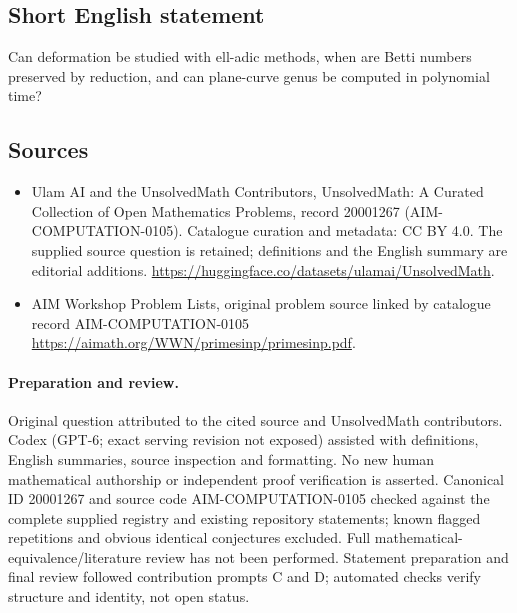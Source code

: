 \documentclass[11pt]{article}
\begin{document}
\subsection{Short English statement}
Can deformation be studied with ell-adic methods, when are Betti numbers preserved by reduction, and can plane-curve genus be computed in polynomial time?
\subsection{Sources}
\begin{itemize}
\item[\hypertarget{source:20001267:1}{S1}] Ulam AI and the UnsolvedMath Contributors, UnsolvedMath: A Curated Collection of Open Mathematics Problems, record 20001267 (AIM-COMPUTATION-0105). Catalogue curation and metadata: CC BY 4.0. The supplied source question is retained; definitions and the English summary are editorial additions.
\url{https://huggingface.co/datasets/ulamai/UnsolvedMath}.
\item[\hypertarget{source:20001267:2}{S2}] AIM Workshop Problem Lists, original problem source linked by catalogue record AIM-COMPUTATION-0105
\url{https://aimath.org/WWN/primesinp/primesinp.pdf}.
\end{itemize}
\paragraph{Preparation and review.}
Original question attributed to the cited source and UnsolvedMath contributors. Codex (GPT-6; exact serving revision not exposed) assisted with definitions, English summaries, source inspection and formatting. No new human mathematical authorship or independent proof verification is asserted. Canonical ID 20001267 and source code AIM-COMPUTATION-0105 checked against the complete supplied registry and existing repository statements; known flagged repetitions and obvious identical conjectures excluded. Full mathematical-equivalence/literature review has not been performed. Statement preparation and final review followed contribution prompts C and D; automated checks verify structure and identity, not open status.
\label{end:20001267}
\end{document}
